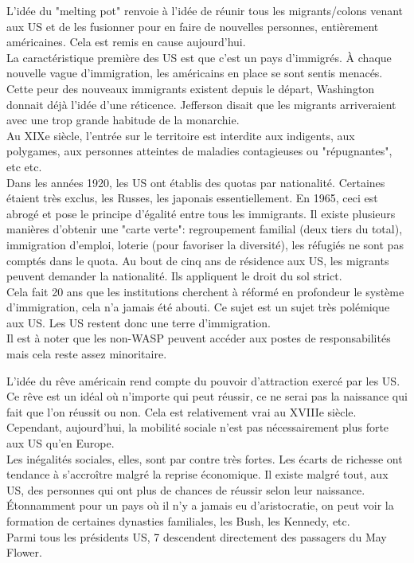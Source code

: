 \documentclass[10pt, a4paper, openany]{book}
\begin{document}
L'idée du "melting pot" renvoie à l'idée de réunir tous les migrants/colons venant aux US et de les fusionner pour en faire de nouvelles personnes, entièrement américaines. Cela est remis en cause aujourd'hui. \\
La caractéristique première des US est que c'est un pays d'immigrés. À chaque nouvelle vague d'immigration, les américains en place se sont sentis menacés. Cette peur des nouveaux immigrants existent depuis le départ, Washington donnait déjà l'idée d'une réticence. Jefferson disait que les migrants arriveraient avec une trop grande habitude de la monarchie. \\
Au XIXe siècle, l'entrée sur le territoire est interdite aux indigents, aux polygames, aux personnes atteintes de maladies contagieuses ou "répugnantes", etc etc. \\
Dans les années 1920, les US ont établis des quotas par nationalité. Certaines étaient très exclus, les Russes, les japonais essentiellement. En 1965, ceci est abrogé et pose le principe d'égalité entre tous les immigrants. Il existe plusieurs manières d'obtenir une "carte verte": regroupement familial (deux tiers du total), immigration d'emploi, loterie (pour favoriser la diversité), les réfugiés ne sont pas comptés dans le quota. Au bout de cinq ans de résidence aux US, les migrants peuvent demander la nationalité. Ils appliquent le droit du sol strict. \\
Cela fait 20 ans que les institutions cherchent à réformé en profondeur le système d'immigration, cela n'a jamais été abouti. Ce sujet est un sujet très polémique aux US. Les US restent donc une terre d'immigration. \\
Il est à noter que les non-WASP peuvent accéder aux postes de responsabilités mais cela reste assez minoritaire. 


L'idée du rêve américain rend compte du pouvoir d'attraction exercé par les US. Ce rêve est un idéal où n'importe qui peut réussir, ce ne serai pas la naissance qui fait que l'on réussit ou non. Cela est relativement vrai au XVIIIe siècle. Cependant, aujourd'hui, la mobilité sociale n'est pas nécessairement plus forte aux US qu'en Europe. \\
Les inégalités sociales, elles, sont par contre très fortes. Les écarts de richesse ont tendance à s'accroître malgré la reprise économique. Il existe malgré tout, aux US, des personnes qui ont plus de chances de réussir selon leur naissance. \\
Étonnamment pour un pays où il n'y a jamais eu d'aristocratie, on peut voir la formation de certaines dynasties familiales, les Bush, les Kennedy, etc. \\
Parmi tous les présidents US, 7 descendent directement des passagers du May Flower. 
\end{document}
